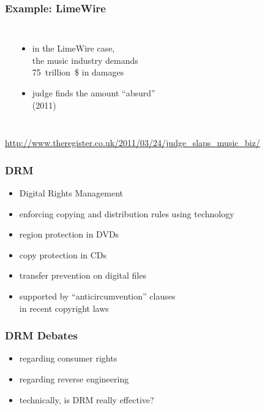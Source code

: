 \documentclass[dvipsnames]{beamer}
\theoremstyle{plain}
\begin{document}
\begin{frame}
  \frametitle{Example: LimeWire}

  \begin{columns}
    \begin{center}
    \end{center}

    \begin{itemize}
      \item in the LimeWire case,\\
        the music industry demands\\
        75~trillion~\$ in damages
      \item judge finds the amount ``absurd''\\
        (2011)
    \end{itemize}
  \end{columns}

  \medskip
  \tiny{\url{http://www.theregister.co.uk/2011/03/24/judge_slaps_music_biz/}}\\
\end{frame}

\begin{frame}
  \frametitle{DRM}

  \begin{itemize}
    \item Digital Rights Management
    \item enforcing copying and distribution rules using technology

    \medskip
    \item region protection in DVDs
    \item copy protection in CDs
    \item transfer prevention on digital files

    \pause
    \medskip
    \item supported by ``anticircumvention'' clauses\\
      in recent copyright laws
  \end{itemize}
\end{frame}

\begin{frame}
  \frametitle{DRM Debates}

  \begin{itemize}
    \item regarding consumer rights
    \item regarding reverse engineering
    \item technically, is DRM really effective?
  \end{itemize}
\end{frame}
\end{document}
